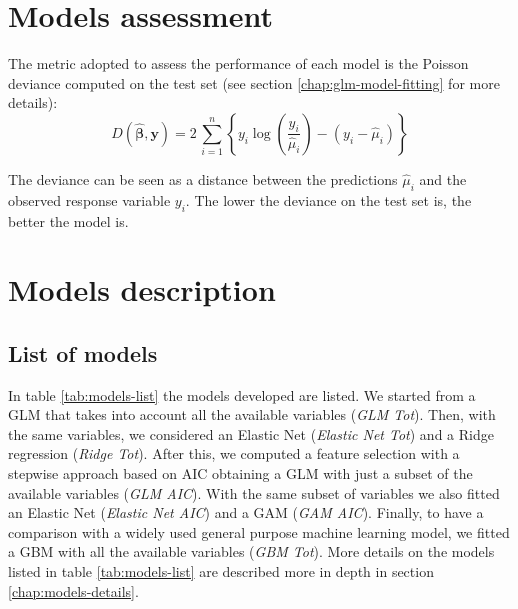 \documentclass[a4paper, twoside, openright, 12pt]{report}
\theoremstyle{definition}
\theoremstyle{definition}
\theoremstyle{definition}
\theoremstyle{remark}
\begin{document}
\newpage

\hypertarget{models-assessment}{%
\section{Models assessment}\label{models-assessment}}

The metric adopted to assess the performance of each model is the Poisson deviance computed on the test set (see section \ref{chap:glm-model-fitting} for more details):
\[
D(\hat{\boldsymbol{\beta}}, \boldsymbol{y}) = 2\,\sum_{i=1}^{n}{\left\{ y_i \log{\left(\frac{y_i}{\hat{\mu}_i}\right)} - \left( y_i - \hat{\mu}_i \right) \right\}}
\]

The deviance can be seen as a distance between the predictions \(\hat{\mu}_i\) and the observed response variable \(y_i\). The lower the deviance on the test set is, the better the model is.

\newpage

\hypertarget{models-description}{%
\section{Models description}\label{models-description}}

\hypertarget{list-of-models}{%
\subsection{List of models}\label{list-of-models}}

In table \ref{tab:models-list} the models developed are listed. We started from a GLM that takes into account all the available variables (\emph{GLM Tot}). Then, with the same variables, we considered an Elastic Net (\emph{Elastic Net Tot}) and a Ridge regression (\emph{Ridge Tot}). After this, we computed a feature selection with a stepwise approach based on AIC obtaining a GLM with just a subset of the available variables (\emph{GLM AIC}). With the same subset of variables we also fitted an Elastic Net (\emph{Elastic Net AIC}) and a GAM (\emph{GAM AIC}). Finally, to have a comparison with a widely used general purpose machine learning model, we fitted a GBM with all the available variables (\emph{GBM Tot}). More details on the models listed in table \ref{tab:models-list} are described more in depth in section \ref{chap:models-details}.
\end{document}
